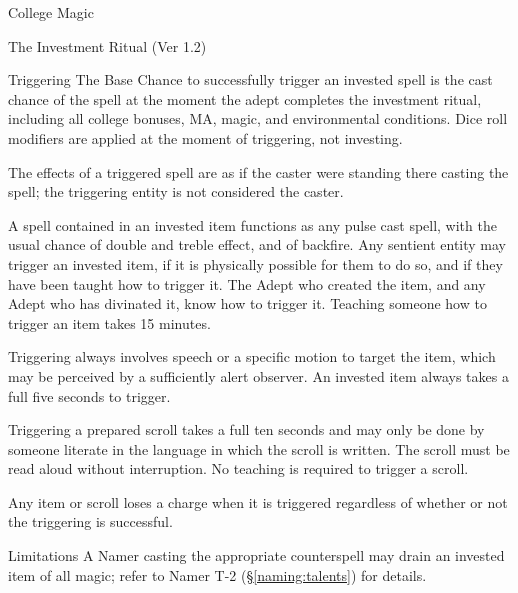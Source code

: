 \begin{Chapter}{College Magic}
\begin{ritual}{The Investment Ritual (Ver 1.2)}
\begin{effects}
\begin{Description}
\item[Triggering] The Base Chance to successfully trigger an invested
  spell is the cast chance of the spell at the moment the adept
  completes the investment ritual, including all college bonuses, MA,
  magic, and environmental conditions.  Dice roll modifiers are
  applied at the moment of triggering, not investing.


The effects of a triggered spell are as if the caster were standing
there casting the spell; the triggering entity is not considered the
caster.

A spell contained in an invested item functions as any pulse cast
spell, with the usual chance of double and treble effect, and of
backfire. Any sentient entity may trigger an invested item, if it is
physically possible for them to do so, and if they have been taught
how to trigger it.  The Adept who created the item, and any Adept who
has divinated it, know how to trigger it.  Teaching someone how to
trigger an item takes 15 minutes.

Triggering always involves speech or a specific motion to target the
item, which may be perceived by a sufficiently alert observer.  An
invested item always takes a full five seconds to trigger.

Triggering a prepared scroll takes a full ten seconds and may only be
done by someone literate in the language in which the scroll is
written.  The scroll must be read aloud without interruption.  No
teaching is required to trigger a scroll.

Any item or scroll loses a charge when it is triggered regardless of
whether or not the triggering is successful.

\item[Limitations] A Namer casting the appropriate counterspell may
  drain an invested item of all magic; refer to Namer T-2
  (\S\ref{naming:talents}) for details.
\end{Description}
\end{effects}
\end{ritual}
\end{Chapter}
